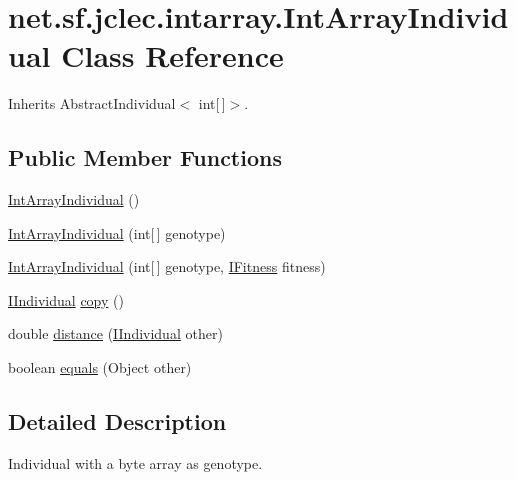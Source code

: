 \hypertarget{classnet_1_1sf_1_1jclec_1_1intarray_1_1_int_array_individual}{\section{net.\-sf.\-jclec.\-intarray.\-Int\-Array\-Individual Class Reference}
\label{classnet_1_1sf_1_1jclec_1_1intarray_1_1_int_array_individual}
}


Inherits Abstract\-Individual$<$ int\mbox{[}$\,$\mbox{]}$>$.

\subsection*{Public Member Functions}
\begin{DoxyCompactItemize}
\item 
\hyperlink{classnet_1_1sf_1_1jclec_1_1intarray_1_1_int_array_individual_ab911874907fea76abc0a8cc10b1ccb62}{Int\-Array\-Individual} ()
\item 
\hyperlink{classnet_1_1sf_1_1jclec_1_1intarray_1_1_int_array_individual_a8bfc4bef1b0eb6ef3bc8ce9d04b66259}{Int\-Array\-Individual} (int\mbox{[}$\,$\mbox{]} genotype)
\item 
\hyperlink{classnet_1_1sf_1_1jclec_1_1intarray_1_1_int_array_individual_a5fa969b203cbba5fe520e56c32897c50}{Int\-Array\-Individual} (int\mbox{[}$\,$\mbox{]} genotype, \hyperlink{interfacenet_1_1sf_1_1jclec_1_1_i_fitness}{I\-Fitness} fitness)
\item 
\hyperlink{interfacenet_1_1sf_1_1jclec_1_1_i_individual}{I\-Individual} \hyperlink{classnet_1_1sf_1_1jclec_1_1intarray_1_1_int_array_individual_acea02bd8ec05696aa4aa8013829630fd}{copy} ()
\item 
double \hyperlink{classnet_1_1sf_1_1jclec_1_1intarray_1_1_int_array_individual_a207347e3df1874da2bae48e74105a105}{distance} (\hyperlink{interfacenet_1_1sf_1_1jclec_1_1_i_individual}{I\-Individual} other)
\item 
boolean \hyperlink{classnet_1_1sf_1_1jclec_1_1intarray_1_1_int_array_individual_afa897c3e2cfe19c2b851b91ed6761808}{equals} (Object other)
\end{DoxyCompactItemize}


\subsection{Detailed Description}
Individual with a byte array as genotype.


